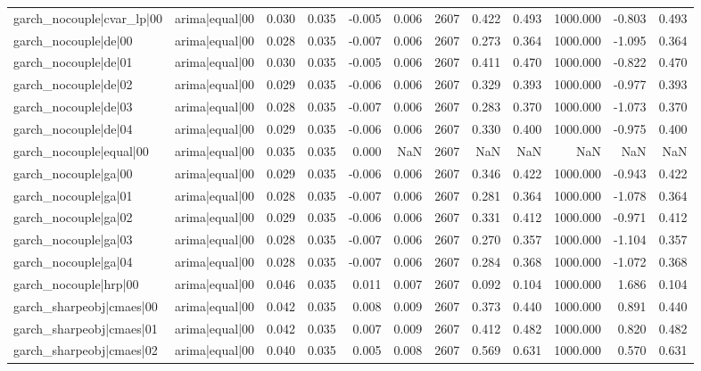 \begin{table}
\begin{tabular}{llrrrrrrrrrr}
garch\_nocouple|cvar\_lp|00 & arima|equal|00 & 0.030 & 0.035 & -0.005 & 0.006 & 2607 & 0.422 & 0.493 & 1000.000 & -0.803 & 0.493 \\
garch\_nocouple|de|00 & arima|equal|00 & 0.028 & 0.035 & -0.007 & 0.006 & 2607 & 0.273 & 0.364 & 1000.000 & -1.095 & 0.364 \\
garch\_nocouple|de|01 & arima|equal|00 & 0.030 & 0.035 & -0.005 & 0.006 & 2607 & 0.411 & 0.470 & 1000.000 & -0.822 & 0.470 \\
garch\_nocouple|de|02 & arima|equal|00 & 0.029 & 0.035 & -0.006 & 0.006 & 2607 & 0.329 & 0.393 & 1000.000 & -0.977 & 0.393 \\
garch\_nocouple|de|03 & arima|equal|00 & 0.028 & 0.035 & -0.007 & 0.006 & 2607 & 0.283 & 0.370 & 1000.000 & -1.073 & 0.370 \\
garch\_nocouple|de|04 & arima|equal|00 & 0.029 & 0.035 & -0.006 & 0.006 & 2607 & 0.330 & 0.400 & 1000.000 & -0.975 & 0.400 \\
garch\_nocouple|equal|00 & arima|equal|00 & 0.035 & 0.035 & 0.000 & NaN & 2607 & NaN & NaN & NaN & NaN & NaN \\
garch\_nocouple|ga|00 & arima|equal|00 & 0.029 & 0.035 & -0.006 & 0.006 & 2607 & 0.346 & 0.422 & 1000.000 & -0.943 & 0.422 \\
garch\_nocouple|ga|01 & arima|equal|00 & 0.028 & 0.035 & -0.007 & 0.006 & 2607 & 0.281 & 0.364 & 1000.000 & -1.078 & 0.364 \\
garch\_nocouple|ga|02 & arima|equal|00 & 0.029 & 0.035 & -0.006 & 0.006 & 2607 & 0.331 & 0.412 & 1000.000 & -0.971 & 0.412 \\
garch\_nocouple|ga|03 & arima|equal|00 & 0.028 & 0.035 & -0.007 & 0.006 & 2607 & 0.270 & 0.357 & 1000.000 & -1.104 & 0.357 \\
garch\_nocouple|ga|04 & arima|equal|00 & 0.028 & 0.035 & -0.007 & 0.006 & 2607 & 0.284 & 0.368 & 1000.000 & -1.072 & 0.368 \\
garch\_nocouple|hrp|00 & arima|equal|00 & 0.046 & 0.035 & 0.011 & 0.007 & 2607 & 0.092 & 0.104 & 1000.000 & 1.686 & 0.104 \\
garch\_sharpeobj|cmaes|00 & arima|equal|00 & 0.042 & 0.035 & 0.008 & 0.009 & 2607 & 0.373 & 0.440 & 1000.000 & 0.891 & 0.440 \\
garch\_sharpeobj|cmaes|01 & arima|equal|00 & 0.042 & 0.035 & 0.007 & 0.009 & 2607 & 0.412 & 0.482 & 1000.000 & 0.820 & 0.482 \\
garch\_sharpeobj|cmaes|02 & arima|equal|00 & 0.040 & 0.035 & 0.005 & 0.008 & 2607 & 0.569 & 0.631 & 1000.000 & 0.570 & 0.631 \\

\end{tabular}
\end{table}
